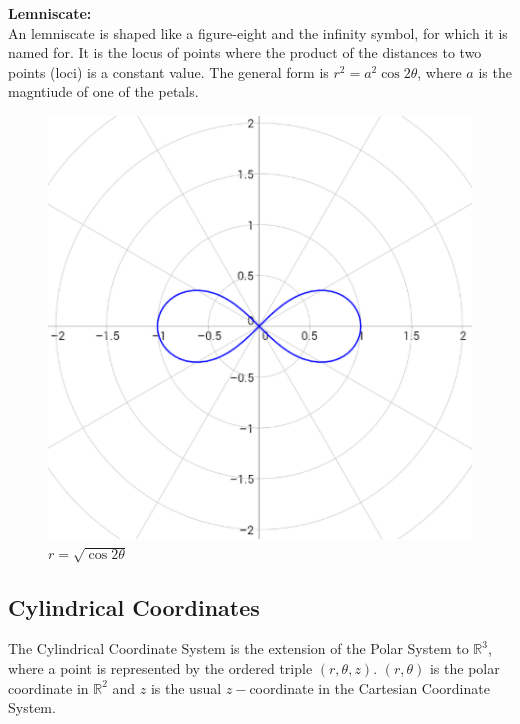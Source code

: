 \documentclass{article}
\begin{document}
            \noindent \textbf{Lemniscate:} \\
            An lemniscate is shaped like a figure-eight and the infinity symbol, for which it is named for.
            It is the locus of points where the product of the distances to two points (loci) is a
            constant value. The general form is $r^2=a^2\cos{2\theta}$, where $a$ is the magntiude
            of one of the petals.

            \begin{figure} [hbt!]
                \centering
                \includegraphics[scale=0.4]{Resources/Unit3Vectors/lemniscate.PNG}
                \caption*{$r=\sqrt{\cos{2\theta}}$}
            \end{figure}


        \subsection{Cylindrical Coordinates}
            The Cylindrical Coordinate System is the extension of the Polar System to $\mathbb{R}^3$,
            where a point is represented by the ordered triple $(r,\theta,z)$. $(r,\theta)$ is the
            polar coordinate in $\mathbb{R}^2$ and $z$ is the usual $z-$coordinate in the Cartesian
            Coordinate System. \\
\end{document}
